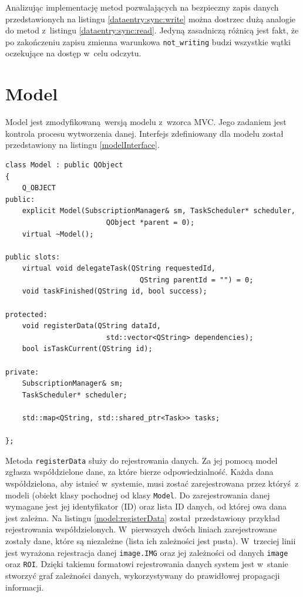 Analizując implementację metod pozwalających na bezpieczny zapis danych przedstawionych na listingu \ref{dataentry:sync:write} można dostrzec dużą analogie do metod z~listingu \ref{dataentry:sync:read}. Jedyną zasadniczą różnicą jest fakt, że po zakończeniu zapisu zmienna warunkowa \lstinline$not_writing$ budzi wszystkie wątki oczekujące na dostęp w~celu odczytu.

\section{Model}

Model jest zmodyfikowaną wersją modelu z~wzorca MVC. Jego zadaniem jest kontrola procesu wytworzenia danej. Interfejs zdefiniowany dla modelu został przedstawiony na listingu \ref{modelInterface}.

\begin{minipage}{\textwidth}
	\begin{lstlisting}[label=modelInterface, caption={Interfejs klasy \lstinline$Model$},alsoletter={()[].=}]
class Model : public QObject
{
	Q_OBJECT
public:
	explicit Model(SubscriptionManager& sm, TaskScheduler* scheduler,
						QObject *parent = 0);
	virtual ~Model();

public slots:
	virtual void delegateTask(QString requestedId,
								QString parentId = "") = 0;
	void taskFinished(QString id, bool success);

protected:
	void registerData(QString dataId,
						std::vector<QString> dependencies);
	bool isTaskCurrent(QString id);

private:
	SubscriptionManager& sm;
	TaskScheduler* scheduler;
	
	std::map<QString, std::shared_ptr<Task>> tasks;

};
	\end{lstlisting}
\end{minipage}


Metoda \lstinline$registerData$ służy do rejestrowania danych. Za jej pomocą model zgłasza współdzielone dane, za które bierze odpowiedzialność. Każda dana współdzielona, aby istnieć w~systemie, musi zostać zarejestrowana przez któryś z modeli (obiekt klasy pochodnej od klasy \lstinline$Model$. Do zarejestrowania danej wymagane jest jej identyfikator (ID) oraz lista ID danych, od której owa dana jest zależna. Na listingu \ref{model:registerData} został przedstawiony przykład rejestrowania współdzielonych. W~pierwszych dwóch liniach zarejestrowane zostały dane, które są niezależne (lista ich zależności jest pusta). W~trzeciej linii jest wyrażona rejestracja danej \lstinline$image.IMG$ oraz jej zależności od danych \lstinline$image$ oraz \lstinline$ROI$. Dzięki takiemu formatowi rejestrowania danych system jest w~stanie stworzyć graf zależności danych, wykorzystywany do prawidłowej propagacji informacji.

